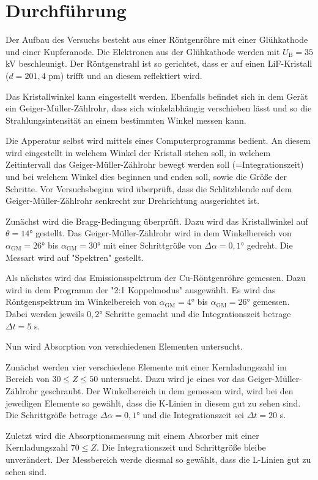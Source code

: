 \section{Durchführung}
\label{sec:Durchführung}

Der Aufbau des Versuchs besteht aus einer Röntgenröhre mit einer Glühkathode und einer Kupferanode.
Die Elektronen aus der Glühkathode werden mit $U_\text{B} = 35$ kV beschleunigt. Der Röntgenstrahl ist so gerichtet, dass er auf einen LiF-Kristall ($d = 201,4$ pm) trifft und an diesem reflektiert wird.

Das Kristallwinkel kann eingestellt werden.
Ebenfalls befindet sich in dem Gerät ein Geiger-Müller-Zählrohr, dass sich winkelabhängig verschieben lässt und so die Strahlungsintensität an einem bestimmten Winkel messen kann.

Die Apperatur selbst wird mittels eines Computerprogramms bedient.
An diesem wird eingestellt in welchem Winkel der Kristall stehen soll, in welchem Zeitintervall das Geiger-Müller-Zählrohr bewegt werden soll (=Integrationszeit) und bei welchem Winkel dies beginnen und enden soll, sowie die Größe der Schritte.
Vor Versuchsbeginn wird überprüft, dass die Schlitzblende auf dem Geiger-Müller-Zählrohr senkrecht zur Drehrichtung ausgerichtet ist.

Zunächst wird die Bragg-Bedingung überprüft. Dazu wird das Kristallwinkel auf $\theta = 14°$ gestellt. Das Geiger-Müller-Zählrohr wird in dem Winkelbereich von $\alpha_\text{GM} = 26°$ bis $\alpha_\text{GM} = 30°$ mit einer Schrittgröße von $\Delta \alpha = 0,1°$ gedreht.
Die Messart wird auf "Spektren" gestellt.

Als nächstes wird das Emissionsspektrum der Cu-Röntgenröhre gemessen.
Dazu wird in dem Programm der "2:1 Koppelmodus" ausgewählt. Es wird das Röntgenspektrum im Winkelbereich von $\alpha_\text{GM} = 4°$ bis $\alpha_\text{GM} = 26°$ gemessen.
Dabei werden jeweils $0,2°$ Schritte gemacht und die Integrationszeit betrage $\Delta t = 5$ s.

Nun wird Absorption von verschiedenen Elementen untersucht.

Zunächst werden vier verschiedene Elemente mit einer Kernladungszahl im Bereich von $30 \leq Z \leq 50$ untersucht.
Dazu wird je eines vor das Geiger-Müller-Zählrohr geschraubt. Der Winkelbereich in dem gemessen wird, wird bei den jeweiligen Elemente so gewählt, dass die K-Linien in diesem gut zu sehen sind.
Die Schrittgröße betrage $\Delta \alpha = 0,1°$ und die Integrationszeit sei $\Delta t = 20$ s.

Zuletzt wird die Absorptionsmessung mit einem Absorber mit einer Kernladungszahl $70 \leq Z$. Die Integrationszeit und Schrittgröße bleibe unverändert.
Der Messbereich werde diesmal so gewählt, dass die L-Linien gut zu sehen sind.

